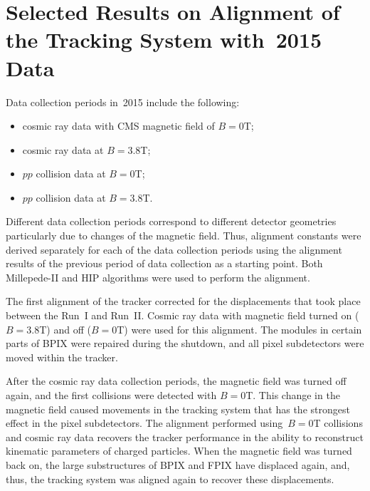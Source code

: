 \section{Selected Results on Alignment of the Tracking System with~2015 Data}
\label{sec:alignmentResults}

Data collection periods in~2015 include the following:
\begin{itemize}
  \item cosmic ray data with CMS magnetic field of $B=0$T;
  \item cosmic ray data at $B=3.8$T;
  \item $pp$ collision data at $B=0$T;
  \item $pp$ collision data at $B=3.8$T.
\end{itemize}

Different data collection periods correspond to different detector geometries particularly due to changes of the magnetic field. Thus, alignment constants were derived separately for each of the data collection periods using the alignment results of the previous period of data collection as a starting point. Both Millepede-II and HIP algorithms were used to perform the alignment. 

The first alignment of the tracker corrected for the displacements that took place between the Run~I and Run~II. Cosmic ray data with magnetic field turned on ($B=3.8$T) and off ($B=0$T) were used for this alignment. The modules in certain parts of BPIX were repaired during the shutdown, and all pixel subdetectors were moved within the tracker. 

After the cosmic ray data collection periods, the magnetic field was turned off again, and the first collisions were detected with $B=0$T. This change in the magnetic field caused movements in the tracking system that has the strongest effect in the pixel subdetectors. The alignment performed using~$B=0$T collisions and cosmic ray data recovers the tracker performance in the ability to reconstruct kinematic parameters of charged particles. When the magnetic field was turned back on, the large substructures of BPIX and FPIX have displaced again, and, thus, the tracking system was aligned again to recover these displacements.  


